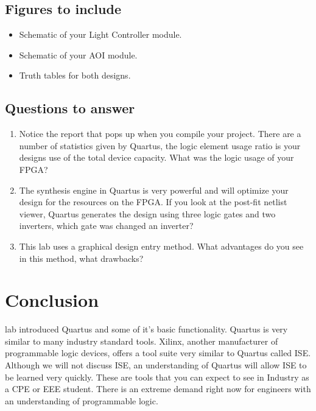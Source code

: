     \subsection{Figures to include}
    \begin{itemize}
      \item Schematic of your Light Controller module.
      \item Schematic of your AOI module.
      \item Truth tables for both designs.
    \end{itemize}

    \subsection{Questions to answer}
    \begin{enumerate}
      \item Notice the report that pops up when you compile your project. There are a number of statistics given by Quartus, the logic element usage ratio is your designs use of the total device capacity. What was the logic usage of your FPGA?
      \item The synthesis engine in Quartus is very powerful and will optimize your design for the resources on the FPGA. If you look at the post-fit netlist viewer, Quartus generates the design using three logic gates and two inverters, which gate was changed an inverter?
      \item This lab uses a graphical design entry method. What advantages do you see in this method,  what drawbacks?
    \end{enumerate}

  \section{Conclusion}
     lab introduced Quartus and some of it's basic functionality. Quartus is very similar to many industry standard tools. Xilinx, another manufacturer of programmable logic devices, offers a tool suite very similar to Quartus called ISE. Although we will not discuss ISE, an understanding of Quartus will allow ISE to be learned very quickly. These are tools that you can expect to see in Industry as a CPE or EEE student. There is an extreme demand right now for engineers with an understanding of programmable logic.

  

